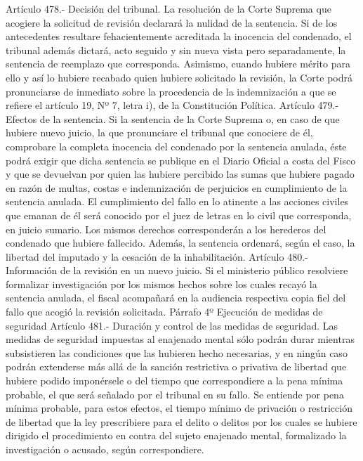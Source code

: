     Artículo 478.- Decisión del tribunal. La resolución de la Corte Suprema que acogiere la solicitud de revisión declarará la nulidad de la sentencia.
    Si de los antecedentes resultare fehacientemente acreditada la inocencia del condenado, el tribunal además dictará, acto seguido y sin nueva vista pero separadamente, la sentencia de reemplazo que corresponda.
    Asimismo, cuando hubiere mérito para ello y así lo hubiere recabado quien hubiere solicitado la revisión, la Corte podrá pronunciarse de inmediato sobre la procedencia de la indemnización a que se refiere el artículo 19, Nº 7, letra i), de la Constitución Política.
    Artículo 479.- Efectos de la sentencia. Si la sentencia de la Corte Suprema o, en caso de que hubiere nuevo juicio, la que pronunciare el tribunal que conociere de él, comprobare la completa inocencia del condenado por la sentencia anulada, éste podrá exigir que dicha sentencia se publique en el Diario Oficial a costa del Fisco y que se devuelvan por quien las hubiere percibido las sumas que hubiere pagado en razón de multas, costas e indemnización de perjuicios en cumplimiento de la sentencia anulada.
    El cumplimiento del fallo en lo atinente a las acciones civiles que emanan de él será conocido por el juez de letras en lo civil que corresponda, en juicio sumario.
    Los mismos derechos corresponderán a los herederos del condenado que hubiere fallecido.
    Además, la sentencia ordenará, según el caso, la libertad del imputado y la cesación de la inhabilitación.
    Artículo 480.- Información de la revisión en un nuevo juicio. Si el ministerio público resolviere formalizar investigación por los mismos hechos sobre los cuales recayó la sentencia anulada, el fiscal acompañará en la audiencia respectiva copia fiel del fallo que acogió la revisión solicitada.
    Párrafo 4º Ejecución de medidas de seguridad
    Artículo 481.- Duración y control de las medidas de seguridad. Las medidas de seguridad impuestas al enajenado mental sólo podrán durar mientras subsistieren las condiciones que las hubieren hecho necesarias, y en ningún caso podrán extenderse más allá de la sanción restrictiva o privativa de libertad que hubiere podido imponérsele o del tiempo que correspondiere a la pena mínima probable, el que será señalado por el tribunal en su fallo.
    Se entiende por pena mínima probable, para estos efectos, el tiempo mínimo de privación o restricción de libertad que la ley prescribiere para el delito o delitos por los cuales se hubiere dirigido el procedimiento en contra del sujeto enajenado mental, formalizado la investigación o acusado, según correspondiere.
